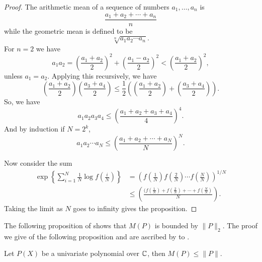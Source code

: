 \begin{proof}
The arithmetic mean of a sequence of numbers $a_1, \ldots, a_n$ is
\[
\frac{a_1 + a_2 + \cdots + a_n}{n}
\]
while the geometric mean is defined to be
\[
\sqrt[n]{a_1 a_2 \cdots a_n}.
\]
For $n = 2$ we have
\[
a_1 a_2 = \left(\frac{a_1 + a_2}{2}\right)^2 
     + \left(\frac{a_1 - a_2}{2}\right)^2
        < \left(\frac{a_1 + a_2}{2}\right)^2,
\]
unless $a_1 = a_2$.  Applying this recursively, we have
\[
\left(\frac{a_1+a_2}{2}\right) \left(\frac{a_3+a_4}{2}\right) \le 
\frac{1}{2} \left(\left(\frac{a_1+a_2}{2}\right)+
\left(\frac{a_3+a_4}{2}\right) \right).
\]
So, we have
\[
a_1 a_2 a_3 a_4 \le \left(\frac{a_1+a_2+a_3+a_4}{4}\right)^4.
\]
And by induction if $N = 2^k$,
\[
a_1 a_2 \cdots a_{N} \le \left(\frac{a_1+a_2+\cdots+a_N}{N}\right)^N.
\]

Now consider the sum
\[
\begin{aligned}
  \exp \left\{\sum_{i=1}^N \frac{1}{N}\log f(\frac{i}{N})\right\}
  &= \left(f(\frac{1}{N}) f(\frac{2}{N}) \cdots
f(\frac{N}{N})\right)^{1/N} \\
& \le \left(\frac{(f(\frac{1}{N}) + f(\frac{2}{N}) + \cdots +
f(\frac{N}{N})}{N}\right).
\end{aligned}
\]
Taking the limit as $N$ goes to infinity gives the proposition.
\end{proof}

The following proposition of {\LandauE} \cite{Landau:Zeroes} shows
that $M(P)$ is bounded by $\| P\|_{2}$.  The proof we give of the
following proposition and
 are ascribed by {\Lang}
\cite{Lang:Diophantine:Geometry} to {\Waldschmidt}.

\begin{proposition}[Landau]
\label{Landau:Zeroes:Prop}
Let $P(X)$ be a univariate polynomial over $\mathbb{C}$, then $M(P) \le
\|P\|$.
\end{proposition}

